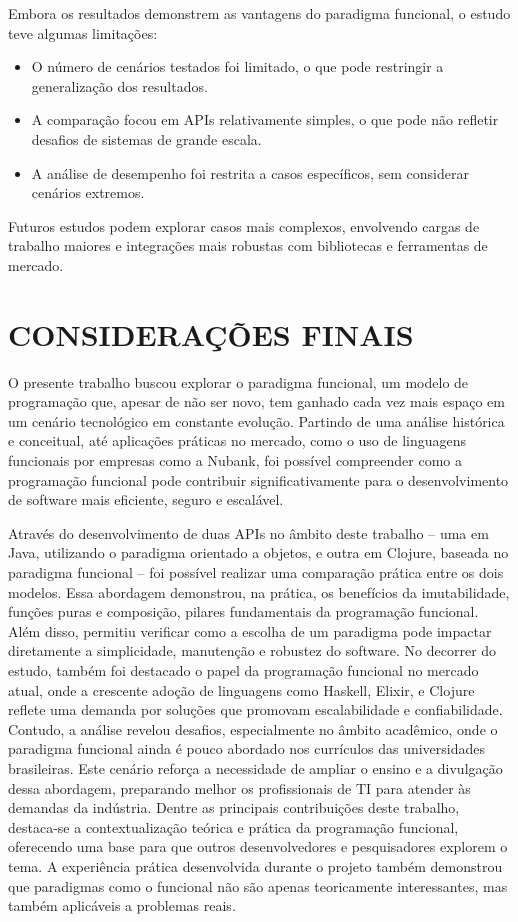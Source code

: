 Embora os resultados demonstrem as vantagens do paradigma funcional, o estudo teve algumas limitações:
\begin{itemize}
    \item O número de cenários testados foi limitado, o que pode restringir a generalização dos resultados.
    \item A comparação focou em APIs relativamente simples, o que pode não refletir desafios de sistemas de grande escala.
    \item A análise de desempenho foi restrita a casos específicos, sem considerar cenários extremos.
\end{itemize}

Futuros estudos podem explorar casos mais complexos, envolvendo cargas de trabalho maiores e integrações mais robustas com bibliotecas e ferramentas de mercado.




\chapter{CONSIDERAÇÕES FINAIS}

O presente trabalho buscou explorar o paradigma funcional, um modelo de programação que, apesar de não ser novo, tem ganhado cada vez mais espaço em um cenário tecnológico em constante evolução. Partindo de uma análise histórica e conceitual, até aplicações práticas no mercado, como o uso de linguagens funcionais por empresas como a Nubank, foi possível compreender como a programação funcional pode contribuir significativamente para o desenvolvimento de software mais eficiente, seguro e escalável.

Através do desenvolvimento de duas APIs no âmbito deste trabalho – uma em Java, utilizando o paradigma orientado a objetos, e outra em Clojure, baseada no paradigma funcional – foi possível realizar uma comparação prática entre os dois modelos. Essa abordagem demonstrou, na prática, os benefícios da imutabilidade, funções puras e composição, pilares fundamentais da programação funcional. Além disso, permitiu verificar como a escolha de um paradigma pode impactar diretamente a simplicidade, manutenção e robustez do software.
No decorrer do estudo, também foi destacado o papel da programação funcional no mercado atual, onde a crescente adoção de linguagens como Haskell, Elixir, e Clojure reflete uma demanda por soluções que promovam escalabilidade e confiabilidade. Contudo, a análise revelou desafios, especialmente no âmbito acadêmico, onde o paradigma funcional ainda é pouco abordado nos currículos das universidades brasileiras. Este cenário reforça a necessidade de ampliar o ensino e a divulgação dessa abordagem, preparando melhor os profissionais de TI para atender às demandas da indústria.
Dentre as principais contribuições deste trabalho, destaca-se a contextualização teórica e prática da programação funcional, oferecendo uma base para que outros desenvolvedores e pesquisadores explorem o tema. A experiência prática desenvolvida durante o projeto também demonstrou que paradigmas como o funcional não são apenas teoricamente interessantes, mas também aplicáveis a problemas reais.

